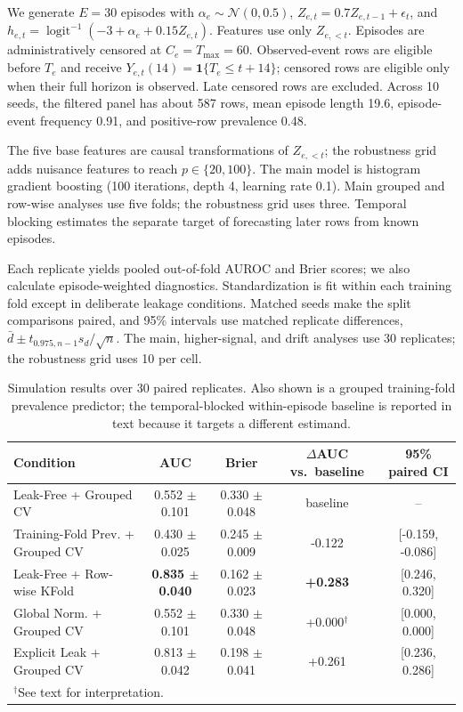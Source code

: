 \documentclass[runningheads]{llncs}
\newcommand{\1}{\mathbf{1}}
\newcommand{\sigmoid}{\operatorname{logit}^{-1}}
\begin{document}
We generate $E=30$ episodes with $\alpha_e \sim \mathcal{N}(0,0.5)$, $Z_{e,t}=0.7Z_{e,t-1}+\epsilon_t$, and $h_{e,t}=\sigmoid(-3+\alpha_e+0.15Z_{e,t})$. Features use only $Z_{e,<t}$. Episodes are administratively censored at $C_e=T_{\max}=60$. Observed-event rows are eligible before $T_e$ and receive $Y_{e,t}(14)=\1\{T_e\leq t+14\}$; censored rows are eligible only when their full horizon is observed. Late censored rows are excluded. Across 10 seeds, the filtered panel has about 587 rows, mean episode length 19.6, episode-event frequency 0.91, and positive-row prevalence 0.48.

The five base features are causal transformations of $Z_{e,<t}$; the robustness grid adds nuisance features to reach $p\in\{20,100\}$. The main model is histogram gradient boosting (100 iterations, depth 4, learning rate 0.1). Main grouped and row-wise analyses use five folds; the robustness grid uses three. Temporal blocking estimates the separate target of forecasting later rows from known episodes.

Each replicate yields pooled out-of-fold AUROC and Brier scores; we also calculate episode-weighted diagnostics. Standardization is fit within each training fold except in deliberate leakage conditions. Matched seeds make the split comparisons paired, and 95\% intervals use matched replicate differences, $\bar d \pm t_{0.975,n-1}s_d/\sqrt n$. The main, higher-signal, and drift analyses use 30 replicates; the robustness grid uses 10 per cell.

\begin{table}[t]
\centering
\caption{Simulation results over 30 paired replicates. Also shown is a grouped training-fold prevalence predictor; the temporal-blocked within-episode baseline is reported in text because it targets a different estimand.}\label{tab:sim}
\scriptsize
\begin{tabular}{@{}p{3.2cm}cccc@{}}
\toprule
Condition & AUC & Brier & $\Delta$AUC vs.\ baseline & 95\% paired CI \\
\midrule
Leak-Free + Grouped CV & 0.552 $\pm$ 0.101 & 0.330 $\pm$ 0.048 & baseline & -- \\
Training-Fold Prev. + Grouped CV & 0.430 $\pm$ 0.025 & 0.245 $\pm$ 0.009 & -0.122 & [-0.159, -0.086] \\
Leak-Free + Row-wise KFold & \textbf{0.835 $\pm$ 0.040} & 0.162 $\pm$ 0.023 & \textbf{+0.283} & [0.246, 0.320] \\
Global Norm. + Grouped CV & 0.552 $\pm$ 0.101 & 0.330 $\pm$ 0.048 & +0.000$^\dagger$ & [0.000, 0.000] \\
Explicit Leak + Grouped CV & 0.813 $\pm$ 0.042 & 0.198 $\pm$ 0.041 & +0.261 & [0.236, 0.286] \\
\bottomrule
\multicolumn{5}{l}{\footnotesize $^\dagger$See text for interpretation.}
\end{tabular}
\end{table}
\end{document}
